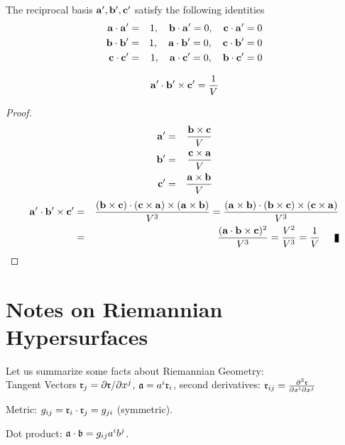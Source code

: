The reciprocal basis ${\bf a'}, {\bf b'}, {\bf c'}$ satisfy the following identities
\begin{eqnarray*}
{\bf a}\cdot {\bf a'}&=& 1, \quad {\bf b}\cdot {\bf a'} = 0, \quad {\bf c}\cdot {\bf a'} =0 \\   
{\bf b}\cdot {\bf b'}&=& 1, \quad {\bf a}\cdot {\bf b'} = 0, \quad {\bf c}\cdot {\bf b'} =0  \\
{\bf c}\cdot {\bf c'}&=& 1,  \quad {\bf a}\cdot {\bf c'} = 0, \quad {\bf b}\cdot {\bf c'} =0 \\
\end{eqnarray*}
 
\begin{theorem}[Reciprocal Basis has Reciprocal Volume = 1/V]
\[ {\bf a'}\cdot{\bf b'} \times {\bf c'} = {1\over V}  \]
\end{theorem}
\begin{proof}
\begin{eqnarray*}
{\bf a'}&=& { {\bf b} \times{\bf c}\over V} \\   
{\bf b'}&=& { {\bf c} \times{\bf a}\over V} \\
{\bf c'}&=& { {\bf a} \times{\bf b}\over V} \\
\end{eqnarray*}
\begin{eqnarray*}
{\bf a'}\cdot{\bf b'} \times {\bf c'}  &=& {({\bf b}\times {\bf c})\cdot({\bf c}\times{\bf a})\times({\bf a}\times {\bf b})\over V^3} = {({\bf a}\times {\bf b})\cdot ({\bf b}\times {\bf c})\times({\bf c}\times{\bf a}) \over V^3} \\
                                                       &=& {({\bf a}\cdot {\bf b} \times {\bf c})^2\over V^3} = {V^2\over V^3} = {1\over V}\qed
\end{eqnarray*}
\end{proof}


 \section{Notes on Riemannian Hypersurfaces}
 

 Let us summarize some facts about Riemannian Geometry:\\
 
Tangent Vectors $\mathfrak{r}_j= \partial\mathfrak{r}/\partial x^j $, $\mathfrak{a} = a^i\mathfrak{r}_i$, second derivatives: $\mathfrak{r}_{ij} = {\partial^2 \mathfrak{r}\over \partial x^i\partial x^j}$

Metric: $g_{ij}= \mathfrak{r}_i\cdot\mathfrak{r}_j = g_{ji}$ (symmetric).

Dot product: $\mathfrak{a}\cdot\mathfrak{b}= g_{ij} a^ib^j$.\\

